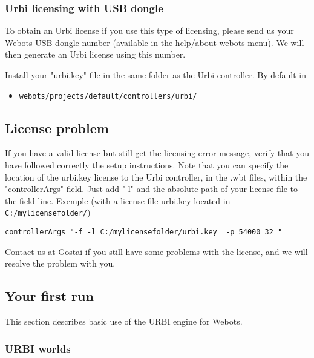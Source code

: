 \subsubsection{Urbi licensing with USB dongle}
\label{webots.license.dongleusb}%

To obtain an Urbi license if you use this type of licensing, please
send us your Webots USB dongle number (available in the help/about
webots menu). We will then generate an Urbi license using this number.


Install your "urbi.key" file in the same folder as the Urbi
controller.  By default in
\begin{itemize}

\item  \nolinkurl{webots/projects/default/controllers/urbi/}

\end{itemize}


\subsection{License problem}
\label{webots.problem}%

If you have a valid license but still get the licensing error message,
verify that you have followed correctly the setup instructions. Note
that you can specify the location of the urbi.key license to the Urbi
controller, in the .wbt files, within the "controllerArgs" field. Just
add "-{}l" and the absolute path of your license file to the field
line. Exemple (with a license file urbi.key located in
\nolinkurl{C:/mylicensefolder/})

\begin{lstlisting}
controllerArgs "-f -l C:/mylicensefolder/urbi.key  -p 54000 32 "
\end{lstlisting}
Contact us at Gostai if you still have some problems with the license,
and we will resolve the problem with you.


\subsection{Your first run}
\label{webots.firstrun}%

This section describes basic use of the URBI engine for Webots.


\subsubsection{URBI worlds}
\label{webots.firstrun.openworld}%

